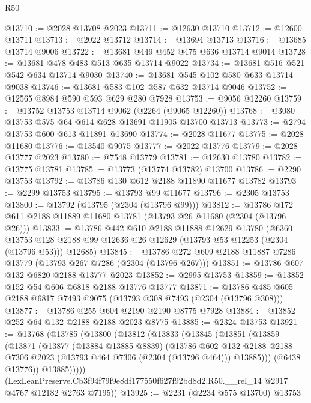 \begin{lexlean}{R50}
\begin{coremodule}
@13710 := @2028 @13708 @2023
@13711 := @12630 @13710
@13712 := @12600 @13711
@13713 := @2022 @13712
@13714 := @13694 @13713
@13716 := @13685 @13714 @9006
@13722 := @13681 @449 @452 @475 @636 @13714 @9014
@13728 := @13681 @478 @483 @513 @635 @13714 @9022
@13734 := @13681 @516 @521 @542 @634 @13714 @9030
@13740 := @13681 @545 @102 @580 @633 @13714 @9038
@13746 := @13681 @583 @102 @587 @632 @13714 @9046
@13752 := @12565 @8984 @590 @593 @629 @280 @7928
@13753 := @9056 @12260
@13759 := @13752 @13753 @13714 @9062 (@2264 (@9065 @12260))
@13768 := @3080 @13753 @575 @64 @614 @628 @13691 @11905 @13700 @13713
@13773 := @2794 @13753 @600 @613 @11891 @13690
@13774 := @2028 @11677
@13775 := @2028 @11680
@13776 := @13540 @9075
@13777 := @2022 @13776
@13779 := @2028 @13777 @2023
@13780 := @7548 @13779
@13781 := @12630 @13780
@13782 := @13775 @13781
@13785 := @13773 (@13774 @13782) @13700
@13786 := @2290 @13753
@13792 := @13786 @130 @612 @2188 @11890 @11677 @13782
@13793 := @2299 @13753
@13795 := @13793 @99 @11677
@13796 := @2305 @13753
@13800 := @13792 (@13795 (@2304 (@13796 @99)))
@13812 := @13786 @172 @611 @2188 @11889 @11680 @13781 (@13793 @26 @11680 (@2304 (@13796 @26)))
@13833 := @13786
    @442
    @610
    @2188
    @11888
    @12629
    @13780
    (@6360 @13753 @128 @2188 @99 @12636 @26 @12629 (@13793 @53 @12253 (@2304 (@13796 @53))) @12685)
@13845 := @13786 @272 @609 @2188 @11887 @7286 @13779 (@13793 @267 @7286 (@2304 (@13796 @267)))
@13851 := @13786 @607 @132 @6820 @2188 @13777 @2023
@13852 := @2995 @13753
@13859 := @13852 @152 @54 @606 @6818 @2188 @13776 @13777
@13871 := @13786 @485 @605 @2188 @6817 @7493 @9075 (@13793 @308 @7493 (@2304 (@13796 @308)))
@13877 := @13786 @255 @604 @2190 @2190 @8775 @7928
@13884 := @13852 @252 @64 @132 @2188 @2188 @2023 @8775
@13885 := @2324 @13753
@13921 := @13768
    (@13785
      (@13800
        (@13812
          (@13833
            (@13845
              (@13851
                (@13859
                  (@13871
                    (@13877
                      (@13884 @13885 @8839)
                      (@13786
                        @602
                        @132
                        @2188
                        @2188
                        @7306
                        @2023
                        (@13793 @464 @7306 (@2304 (@13796 @464)))
                        @13885)))
                  (@6438 @13776))
                @13885)))))
      (LexLeanPreserve.Cb3f94f79f9e8df177550f627f92bd8d2.R50.__rel_14
        @2917
        @4767
        @12182
        @2763
        @7195))
@13925 := @2231 (@2234 @575 @13700) @13753

\end{coremodule}
\end{lexlean}

